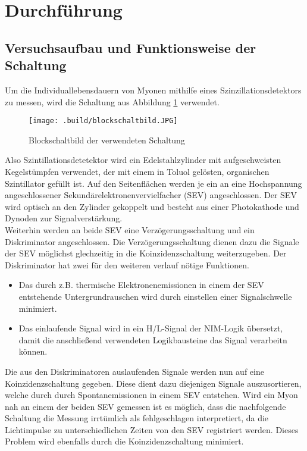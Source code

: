 \section{Durchführung}
\label{sec:Durchführung}
\subsection{Versuchsaufbau und Funktionsweise der Schaltung}
\label{sub:aufbau}
Um die Individuallebensdauern von Myonen mithilfe eines Szinzillationsdetektors zu messen, wird die Schaltung aus Abbildung \ref{fig:schaltung} verwendet.
\begin{figure}[H]
  \centering
  \texttt{[image: .build/blockschaltbild.JPG]}
  \caption{Blockschaltbild der verwendeten Schaltung}
  \label{fig:schaltung}
\end{figure}
Also Szintillationsdetetektor wird ein Edelstahlzylinder mit aufgeschweisten Kegelstümpfen verwendet, der mit einem in Toluol gelösten, organischen Szintillator gefüllt
ist. Auf den Seitenflächen werden je ein an eine Hochspannung angeschlossener Sekundärelektronenvervielfacher (SEV) angeschlossen. Der SEV wird optisch an den Zylinder gekoppelt
und besteht aus einer Photokathode und Dynoden zur Signalverstärkung.\\
Weiterhin werden an beide SEV eine Verzögerungsschaltung und ein Diskriminator angeschlossen. Die Verzögerungsschaltung dienen dazu die Signale der SEV möglichst glechzeitig in
die Koinzidenzschaltung weiterzugeben. Der Diskriminator hat zwei für den weiteren verlauf nötige Funktionen.
\begin{itemize}
  \item[1.] Das durch z.B. thermische Elektronenemissionen in einem der SEV entstehende Untergrundrauschen wird durch einstellen einer Signalschwelle minimiert.
  \item[2.] Das einlaufende Signal wird in ein H/L-Signal der NIM-Logik übersetzt, damit die anschließend verwendeten Logikbausteine das Signal verarbeitn können.
\end{itemize}
Die aus den Diskriminatoren auslaufenden Signale werden nun auf eine Koinzidenzschaltung gegeben. Diese dient dazu diejenigen Signale auszusortieren, welche
durch durch Spontanemissionen in einem SEV entstehen. Wird ein Myon nah an einem der beiden SEV gemessen ist es möglich, dass die nachfolgende Schaltung die Messung
irrtümlich als fehlgeschlagen interpretiert, da die Lichtimpulse zu unterschiedlichen Zeiten von den SEV registriert werden. Dieses Problem wird ebenfalls durch die
Koinzidenzschaltung minimiert.\\
